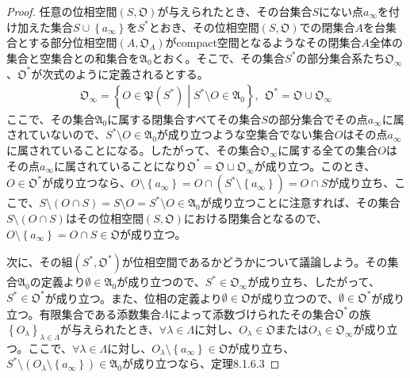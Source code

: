 \documentclass[dvipdfmx]{jsarticle}
\begin{document}
\begin{proof}
任意の位相空間$\left( S,\mathfrak{O} \right)$が与えられたとき、その台集合$S$にない点$a_{\infty}$を付け加えた集合$S \cup \left\{ a_{\infty} \right\}$を$S^{*}$とおき、その位相空間$\left( S,\mathfrak{O} \right)$での閉集合$A$を台集合とする部分位相空間$\left( A,\mathfrak{O}_{A} \right)$がcompact空間となるようなその閉集合$A$全体の集合と空集合との和集合を$\mathfrak{A}_{0}$とおく。そこで、その集合$S^{*}$の部分集合系たち$\mathfrak{O}_{\infty}$、$\mathfrak{O}^{*}$が次式のように定義されるとする。
\begin{align*}
\mathfrak{O}_{\infty} = \left\{ O \in \mathfrak{P}\left( S^{*} \right) \middle| S^{*} \setminus O \in \mathfrak{A}_{0} \right\},\ \ \mathfrak{O}^{*} = \mathfrak{O \cup}\mathfrak{O}_{\infty}
\end{align*}
ここで、その集合$\mathfrak{A}_{0}$に属する閉集合すべてその集合$S$の部分集合でその点$a_{\infty}$に属されていないので、$S^{*} \setminus O \in \mathfrak{A}_{0}$が成り立つような空集合でない集合$O$はその点$a_{\infty}$に属されていることになる。したがって、その集合$\mathfrak{O}_{\infty}$に属する全ての集合$O$はその点$a_{\infty}$に属されていることになり$\mathfrak{O}^{*} = \mathfrak{O \sqcup}\mathfrak{O}_{\infty}$が成り立つ。このとき、$O \in \mathfrak{O}^{*}$が成り立つなら、$O \setminus \left\{ a_{\infty} \right\} = O \cap \left( S^{*} \setminus \left\{ a_{\infty} \right\} \right) = O \cap S$が成り立ち、ここで、$S \setminus (O \cap S) = S \setminus O = S^{*} \setminus O \in \mathfrak{A}_{0}$が成り立つことに注意すれば、その集合$S \setminus (O \cap S)$はその位相空間$\left( S,\mathfrak{O} \right)$における閉集合となるので、$O \setminus \left\{ a_{\infty} \right\} = O \cap S \in \mathfrak{O}$が成り立つ。\par
次に、その組$\left( S^{*},\mathfrak{O}^{*} \right)$が位相空間であるかどうかについて議論しよう。その集合$\mathfrak{A}_{0}$の定義より$\emptyset \in \mathfrak{A}_{0}$が成り立つので、$S^{*} \in \mathfrak{O}_{\infty}$が成り立ち、したがって、$S^{*} \in \mathfrak{O}^{*}$が成り立つ。また、位相の定義より$\mathfrak{\emptyset \in O}$が成り立つので、$\emptyset \in \mathfrak{O}^{*}$が成り立つ。有限集合である添数集合$\varLambda$によって添数づけられたその集合$\mathfrak{O}^{*}$の族$\left\{ O_{\lambda} \right\}_{\lambda \in \varLambda }$が与えられたとき、$\forall\lambda \in \varLambda$に対し、$O_{\lambda}\in \mathfrak{O}$または$O_{\lambda} \in \mathfrak{O}_{\infty}$が成り立つ。ここで、$\forall\lambda \in \varLambda$に対し、$O_{\lambda} \setminus \left\{ a_{\infty} \right\}\in \mathfrak{O}$が成り立ち、$S^{*} \setminus \left( O_{\lambda} \setminus \left\{ a_{\infty} \right\} \right) \in \mathfrak{A}_{0}$が成り立つなら、定理8.1.6.3

\end{proof}
\end{document}
